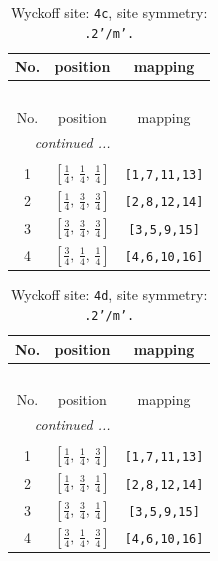 \documentclass[fleqn,8pt]{jsarticle}
\begin{document}
\renewcommand{\arraystretch}{1.2}
\begin{longtable}{ccc}
\caption{Wyckoff site: {\tt 4c}, site symmetry: {\tt .2'/m'.}}
 \\
 \hline \hline
No. & position & mapping \\ \hline \endfirsthead

\multicolumn{2}{l}{\tablename\ \thetable{}} \\
 \hline \hline
No. & position & mapping \\ \hline \endhead

 \hline \hline
\multicolumn{2}{r}{\footnotesize\it continued ...} \\ \endfoot

 \hline \hline
\multicolumn{2}{r}{} \\ \endlastfoot

1 & $\left[ \frac{1}{4},\, \frac{1}{4},\, \frac{1}{4} \right]$ & {\tt [1,7,11,13]} \\ \hline
2 & $\left[ \frac{1}{4},\, \frac{3}{4},\, \frac{3}{4} \right]$ & {\tt [2,8,12,14]} \\ \hline
3 & $\left[ \frac{3}{4},\, \frac{3}{4},\, \frac{3}{4} \right]$ & {\tt [3,5,9,15]} \\ \hline
4 & $\left[ \frac{3}{4},\, \frac{1}{4},\, \frac{1}{4} \right]$ & {\tt [4,6,10,16]} \\
\end{longtable}
\renewcommand{\arraystretch}{1.2}
\begin{longtable}{ccc}
\caption{Wyckoff site: {\tt 4d}, site symmetry: {\tt .2'/m'.}}
 \\
 \hline \hline
No. & position & mapping \\ \hline \endfirsthead

\multicolumn{2}{l}{\tablename\ \thetable{}} \\
 \hline \hline
No. & position & mapping \\ \hline \endhead

 \hline \hline
\multicolumn{2}{r}{\footnotesize\it continued ...} \\ \endfoot

 \hline \hline
\multicolumn{2}{r}{} \\ \endlastfoot

1 & $\left[ \frac{1}{4},\, \frac{1}{4},\, \frac{3}{4} \right]$ & {\tt [1,7,11,13]} \\ \hline
2 & $\left[ \frac{1}{4},\, \frac{3}{4},\, \frac{1}{4} \right]$ & {\tt [2,8,12,14]} \\ \hline
3 & $\left[ \frac{3}{4},\, \frac{3}{4},\, \frac{1}{4} \right]$ & {\tt [3,5,9,15]} \\ \hline
4 & $\left[ \frac{3}{4},\, \frac{1}{4},\, \frac{3}{4} \right]$ & {\tt [4,6,10,16]} \\
\end{longtable}
\end{document}
